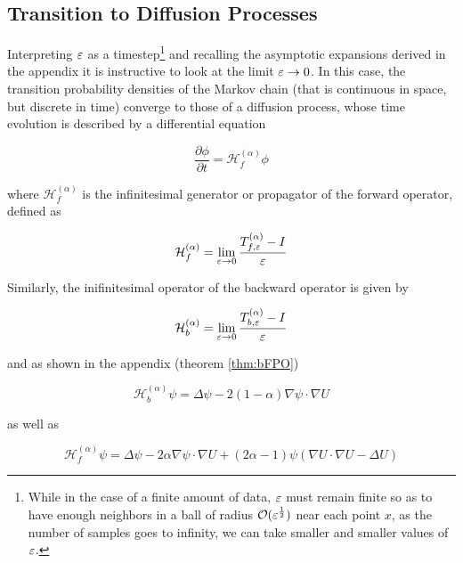 \subsection{Transition to Diffusion Processes}
Interpreting $\varepsilon$ as a timestep\footnote{While in the case of a finite amount of data, $\varepsilon$ must remain finite so as to have enough neighbors in a ball of radius $\mathcal{O}(\varepsilon^\frac{1}{2})$ near each point $x$, as the number of samples goes to infinity, we can take smaller and smaller values of $\varepsilon$.} and recalling the asymptotic expansions derived in the appendix it is instructive to look at the limit $\varepsilon \rightarrow 0$. In this case, the transition probability densities of the Markov chain (that is continuous in space, but discrete in time) converge to those of a diffusion process, whose time evolution is described by a differential equation

\begin{equation*}
\frac{\partial \phi}{\partial t} = \mathcal{H}_f^{(\alpha)}\phi
\end{equation*}

where $\mathcal{H}_f^{(\alpha)}$ is the infinitesimal generator or propagator of the forward operator, defined as

\begin{definition}\label{def:fFP}\begin{equation*}
\mathcal{H}_f^{(\alpha)}=\lim_{\varepsilon\rightarrow 0}\frac{T_{f,\varepsilon}^{(\alpha)}-I}{\varepsilon}
\end{equation*}\end{definition}

Similarly, the inifinitesimal operator of the backward operator is given by

\begin{definition}\label{def:bFP}\begin{equation*}
\mathcal{H}_b^{(\alpha)}=\lim_{\varepsilon\rightarrow 0}\frac{T_{b,\varepsilon}^{(\alpha)}-I}{\varepsilon}
\end{equation*}\end{definition}

and as shown in the appendix (theorem \ref{thm:bFPO})

\begin{equation*}
\mathcal{H}_b^{(\alpha)}\psi = \Delta\psi - 2(1-\alpha)\nabla\psi\cdot\nabla U
\end{equation*}

as well as 

\begin{equation*}
\mathcal{H}_f^{(\alpha)}\psi = \Delta\psi - 2\alpha\nabla\psi\cdot\nabla U + (2\alpha - 1)\psi(\nabla U\cdot\nabla U - \Delta U)
\end{equation*}

